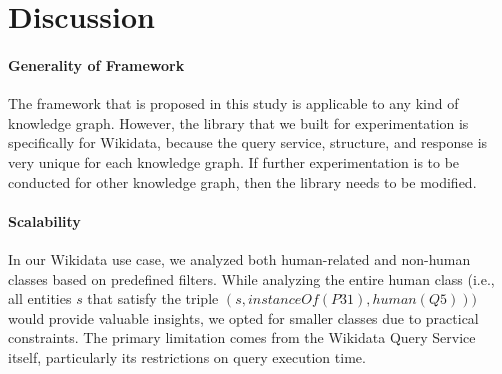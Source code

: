 \section{Discussion}

\paragraph{Generality of Framework}
The framework that is proposed in this study is applicable to any kind of knowledge graph. However, the library that we built for experimentation is specifically for Wikidata, because the query service, structure, and response is very unique for each knowledge graph. If further experimentation is to be conducted for other knowledge graph, then the library needs to be modified.

\paragraph{Scalability}

In our Wikidata use case, we analyzed both human-related and non-human classes based on predefined filters. While analyzing the entire human class (i.e., all entities \(s\) that satisfy the triple 
\((s,instanceOf(P31),human(Q5)))\) would provide valuable insights, we opted for smaller classes due to practical constraints. The primary limitation comes from the Wikidata Query Service itself, particularly its restrictions on query execution time.

